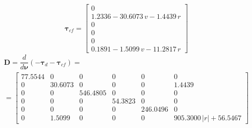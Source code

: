 \documentclass[12pt,a4]{article}
\begin{document}
\begin{equation*}
	\bm{\tau}_{cf} = \left[\begin{array}{c} 0\\ 1.2336-30.6073\,v-1.4439\,r\\ 0\\ 0\\ 0\\ 0.1891-1.5099\,v-11.2817\,r \end{array}\right]
\end{equation*}
\begin{multline*}
	\bm{D} = \dfrac{d}{d\bm{\nu}} (-\bm{\tau}_d-\bm{\tau}_{cf}) = \\
	= \left[\begin{array}{cccccc} 77.5544 & 0 & 0 & 0 & 0 & 0\\ 0 & 30.6073 & 0 & 0 & 0 & 1.4439\\ 0 & 0 & 546.4805 & 0 & 0 & 0\\ 0 & 0 & 0 & 54.3823 & 0 & 0\\ 0 & 0 & 0 & 0 & 246.0496 & 0\\ 0 & 1.5099 & 0 & 0 & 0 & 905.3000\,\left|r\right|+56.5467 \end{array}\right]
\end{multline*}
\end{document}
